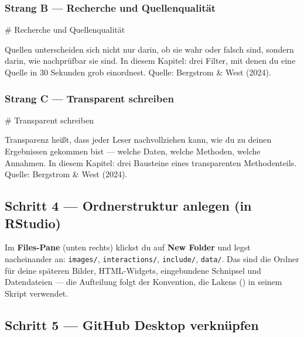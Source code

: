 \documentclass[
  ngerman,
  a4paper,
  DIV=11]{scrreprt}
\newenvironment{Shaded}{\begin{snugshade}}{\end{snugshade}}
\newcommand{\FunctionTok}[1]{\textcolor[rgb]{0.28,0.35,0.67}{#1}}
\newcommand{\NormalTok}[1]{\textcolor[rgb]{0.00,0.23,0.31}{#1}}
\begin{document}
\subsubsection{Strang B --- Recherche und Quellenqualität}

\begin{Shaded}
\begin{Highlighting}[]
\FunctionTok{\# Recherche und Quellenqualität}

\NormalTok{Quellen unterscheiden sich nicht nur darin, ob sie wahr oder falsch sind,}
\NormalTok{sondern darin, wie nachprüfbar sie sind. In diesem Kapitel: drei Filter,}
\NormalTok{mit denen du eine Quelle in 30 Sekunden grob einordnest.}
\NormalTok{Quelle: Bergstrom \& West (2024).}
\end{Highlighting}
\end{Shaded}

\subsubsection{Strang C --- Transparent schreiben}

\begin{Shaded}
\begin{Highlighting}[]
\FunctionTok{\# Transparent schreiben}

\NormalTok{Transparenz heißt, dass jeder Leser nachvollziehen kann, wie du zu deinen}
\NormalTok{Ergebnissen gekommen bist — welche Daten, welche Methoden, welche}
\NormalTok{Annahmen. In diesem Kapitel: drei Bausteine eines transparenten}
\NormalTok{Methodenteils. Quelle: Bergstrom \& West (2024).}
\end{Highlighting}
\end{Shaded}

\subsection{Schritt 4 --- Ordnerstruktur anlegen (in
RStudio)}\label{schritt-4-ordnerstruktur-anlegen-in-rstudio}

Im \textbf{Files-Pane} (unten rechts) klickst du auf \textbf{New Folder}
und legst nacheinander an: \texttt{images/}, \texttt{interactions/},
\texttt{include/}, \texttt{data/}. Das sind die Ordner für deine
späteren Bilder, HTML-Widgets, eingebundene Schnipsel und Datendateien
--- die Aufteilung folgt der Konvention, die Lakens
() in seinem Skript verwendet.

\subsection{Schritt 5 --- GitHub Desktop
verknüpfen}\label{schritt-5-github-desktop-verknuxfcpfen}
\end{document}
